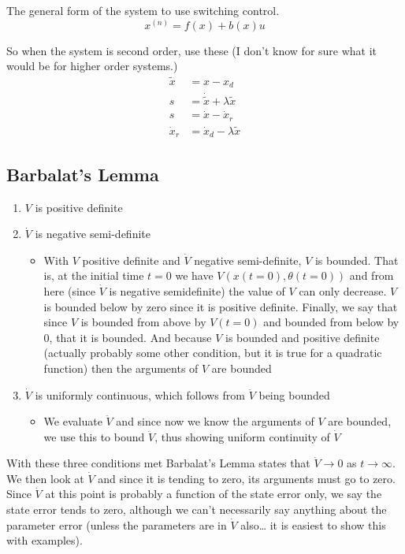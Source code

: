 The general form of the system to use switching control.
\begin{equation*}
  x^{(n)}=f(x)+b(x)u
\end{equation*}

So when the system is second order, use these (I don't know for sure what it would be for higher order systems.)
\begin{align*}
  \tilde{x}&=x-x_{d} \\
  s&=\dot{\tilde{x}}+\lambda\tilde{x} \\
  s&=\dot{x}-\dot{x}_{r} \\
  \dot{x}_{r}&=\dot{x}_{d}-\lambda\tilde{x}
\end{align*}

\subsection{Barbalat's Lemma}

\begin{enumerate}
  \item{$V$ is positive definite}
  \item{$\dot{V}$ is negative semi-definite}
  \begin{itemize}
    \item{With $V$ positive definite and $\dot{V}$ negative semi-definite, $V$ is bounded.
    That is, at the initial time $t=0$ we have $V(x(t=0),\theta(t=0))$ and from here (since $\dot{V}$ is negative semidefinite) the value of $V$ can only decrease.
    $V$ is bounded below by zero since it is positive definite.
    Finally, we say that since $V$ is bounded from above by $V(t=0)$ and bounded from below by 0, that it is bounded.
    And because $V$ is bounded and positive definite (actually probably some other condition, but it is true for a quadratic function) then the arguments of $V$ are bounded}
  \end{itemize}
  \item{$\dot{V}$ is uniformly continuous, which follows from $\ddot{V}$ being bounded}
  \begin{itemize}
    \item{We evaluate $\ddot{V}$ and since now we know the arguments of $V$ are bounded, we use this to bound $\ddot{V}$, thus showing uniform continuity of $\dot{V}$}
  \end{itemize}
\end{enumerate}
With these three conditions met Barbalat's Lemma states that $\dot{V}\rightarrow0$ as $t\rightarrow\infty$.
We then look at $\dot{V}$ and since it is tending to zero, its arguments must go to zero.
Since $\dot{V}$ at this point is probably a function of the state error only, we say the state error tends to zero, although we can't necessarily say anything about the parameter error (unless the parameters are in $\dot{V}$ also\ldots
it is easiest to show this with examples).

